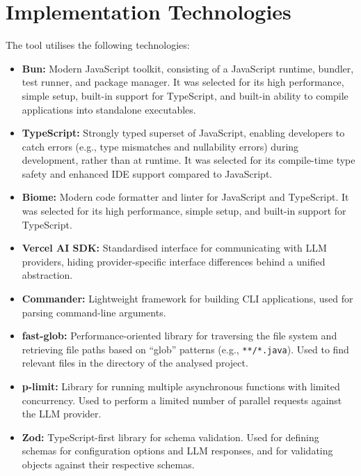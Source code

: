 \section{Implementation Technologies}

The tool utilises the following technologies:

\begin{itemize}
    \item \textbf{Bun:}  Modern JavaScript toolkit, consisting of a JavaScript runtime, bundler, test runner, and package manager. It was selected for its high performance, simple setup, built-in support for TypeScript, and built-in ability to compile applications into standalone executables.
    \item \textbf{TypeScript:}  Strongly typed superset of JavaScript, enabling developers to catch errors (e.g., type mismatches and nullability errors) during development, rather than at runtime. It was selected for its compile-time type safety and enhanced IDE support compared to JavaScript.
    \item \textbf{Biome:}  Modern code formatter and linter for JavaScript and TypeScript. It was selected for its high performance, simple setup, and built-in support for TypeScript.
    \item \textbf{Vercel AI SDK:}  Standardised interface for communicating with LLM providers, hiding provider-specific interface differences behind a unified abstraction.
    \item \textbf{Commander:}  Lightweight framework for building CLI applications, used for parsing command-line arguments.
    \item \textbf{fast-glob:}  Performance-oriented library for traversing the file system and retrieving file paths based on “glob” patterns (e.g., \texttt{**/*.java}). Used to find relevant files in the directory of the analysed project.
    \item \textbf{p-limit:}  Library for running multiple asynchronous functions with limited concurrency. Used to perform a limited number of parallel requests against the LLM provider.
    \item \textbf{Zod:}  TypeScript-first library for schema validation. Used for defining schemas for configuration options and LLM responses, and for validating objects against their respective schemas.
\end{itemize}

